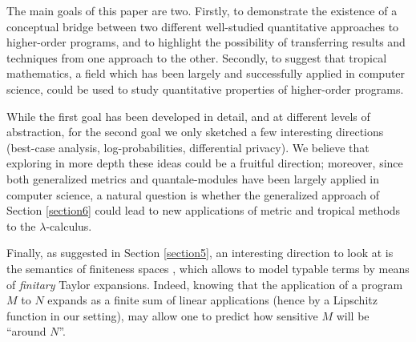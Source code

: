


The main goals of this paper are two. Firstly,  to
demonstrate the existence of a conceptual bridge between two different well-studied quantitative approaches to higher-order programs, and to highlight the possibility of transferring results and techniques from one approach to the other. 
Secondly, to suggest that tropical mathematics, a
field which has been largely and successfully applied in computer science, could be used to study quantitative properties of higher-order programs.

While the first goal has been developed in detail, and at different levels of abstraction, for the second goal we only sketched a few interesting directions (best-case analysis, log-probabilities, differential privacy). We believe that exploring in more depth these ideas could be a fruitful direction; moreover, 
since both generalized metrics and quantale-modules have been largely applied in computer science, 
a natural question is whether the generalized approach of Section \ref{section6} could  lead to new applications of metric and tropical methods to the $\lambda$-calculus.

Finally, as suggested in Section \ref{section5}, an interesting direction to look at is the semantics of finiteness spaces \cite{Ehrhard2005}, which allows to model typable terms by means of \emph{finitary} Taylor expansions. Indeed, knowing that the application of a program $M$ to $N$ expands as a finite sum of linear applications (hence by a Lipschitz function in our setting), may allow one to predict how sensitive $M$ will be ``around $N$''.
%
%
%
%
%
%
%
%
%
%

